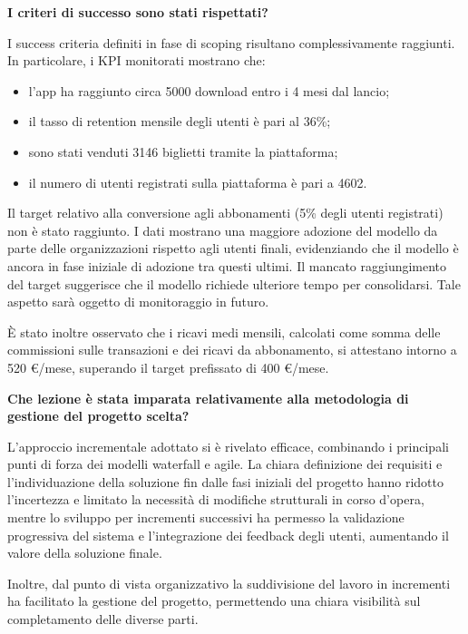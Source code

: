\documentclass[11pt,a4paper]{article}
\providecommand{\tightlist}{\setlength{\itemsep}{0pt}\setlength{\parskip}{0pt}}
\begin{document}
{}

\medskip\noindent\textbf{I criteri di successo sono stati rispettati?}\par\smallskip

{I success criteria definiti in fase di scoping risultano complessivamente raggiunti. In particolare, i KPI monitorati mostrano che:}

\begin{itemize}
\tightlist
\item
  {l’app ha raggiunto circa 5000 download entro i 4 mesi dal lancio;}
\item
  {il tasso di retention mensile degli utenti è pari al 36\%;}
\item
  {sono stati venduti 3146 biglietti tramite la piattaforma;}
\item
  {il numero di utenti registrati sulla piattaforma è pari a 4602.}
\end{itemize}

{Il target relativo alla conversione agli abbonamenti (5\% degli utenti registrati) non è stato raggiunto. I dati mostrano una maggiore adozione del modello da parte delle organizzazioni rispetto agli utenti finali, evidenziando che il modello è ancora in fase iniziale di adozione tra questi ultimi. Il mancato raggiungimento del target suggerisce che il modello richiede ulteriore tempo per consolidarsi. Tale aspetto sarà oggetto di monitoraggio in futuro.}

{È stato inoltre osservato che i ricavi medi mensili, calcolati come somma delle commissioni sulle transazioni e dei ricavi da abbonamento, si attestano intorno a 520 €/mese, superando il target prefissato di 400 €/mese.}

{}

\medskip\noindent\textbf{Che lezione è stata imparata relativamente alla metodologia di gestione del progetto scelta?}\par\smallskip

{L’approccio incrementale adottato si è rivelato efficace, combinando i principali punti di forza dei modelli waterfall e agile. La chiara definizione dei requisiti e l’individuazione della soluzione fin dalle fasi iniziali del progetto hanno ridotto l’incertezza e limitato la necessità di modifiche strutturali in corso d’opera, mentre lo sviluppo per incrementi successivi ha permesso la validazione progressiva del sistema e l’integrazione dei feedback degli utenti, aumentando il valore della soluzione finale.}

{Inoltre, dal punto di vista organizzativo la suddivisione del lavoro in incrementi ha facilitato la gestione del progetto, permettendo una chiara visibilità sul completamento delle diverse parti.}
\end{document}

